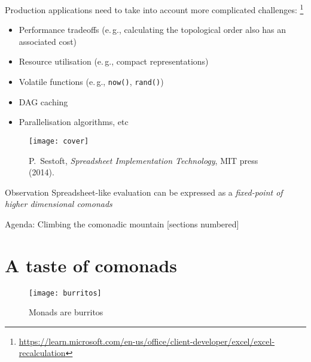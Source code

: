 \documentclass[10pt]{beamer}
\providecommand{\eg}{e.\,g.}
\begin{document}
\begin{frame}[fragile]
  Production applications need to take into account more complicated challenges:%
  \footnote{\url{https://learn.microsoft.com/en-us/office/client-developer/excel/excel-recalculation}}
  \begin{itemize}
    \item Performance tradeoffs (\eg, calculating the topological order also has an associated cost) 
    \item Resource utilisation  (\eg, compact representations) 
    \item Volatile functions (\eg, \verb|now()|, \verb|rand()|)
    \item DAG caching 
    \item Parallelisation algorithms, etc
  \end{itemize}
\end{frame}

\begin{frame}[fragile]
  \begin{figure}
    \centering
    \texttt{[image: cover]}
    \caption{P.~Sestoft, \emph{Spreadsheet Implementation Technology}, MIT press (2014).\protect\footnotemark} 
  \end{figure}
\end{frame}


\begin{frame}[fragile]
  \begin{alertblock}{Observation}
    Spreadsheet-like evaluation can be expressed as a \emph{fixed-point of higher dimensional comonads}
  \end{alertblock}
\end{frame}

\begin{frame}{Agenda: Climbing the comonadic mountain}
  [sections numbered]
  \tableofcontents[hideallsubsections]
\end{frame}

\section{A taste of comonads}

\begin{frame}[fragile]
  \begin{figure}
    \centering
    \texttt{[image: burritos]}
    \caption{Monads are burritos}
  \end{figure}
\end{frame}
\end{document}
